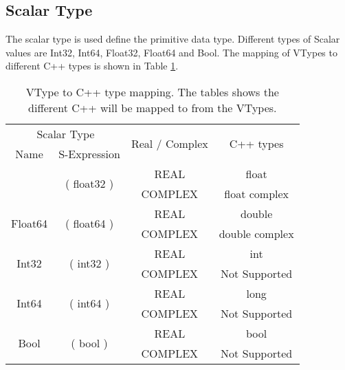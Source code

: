 \subsection{Scalar Type}
The scalar type is used define the primitive data type.
Different types of Scalar values are Int32, Int64, Float32, Float64 and Bool.
The mapping of VTypes to different C++ types is shown in Table \ref{tab:typeMap}.
\begin{table}[h]
\centering
\begin{tabular}{|c|c|c|c|}
\hline
\multicolumn{2}{|c|}{Scalar Type}                                                                 & \multirow{2}{*}{Real / Complex}  & \multirow{2}{*}{C++ types} \\ \cline{1-2}
Name                                         & S-Expression                                      &                              &                            \\ \hhline{|=|=|=|=|}
\multirow{2}{*}{Float32}                     & \multicolumn{1}{c|}{\multirow{2}{*}{( float32 )}} & REAL                         & float                        \\ \cline{3-4} 
                                             & \multicolumn{1}{c|}{}                             & \multicolumn{1}{c|}{COMPLEX} & float complex              \\ \hline
\multirow{2}{*}{Float64}                     & \multicolumn{1}{c|}{\multirow{2}{*}{( float64 )}} & REAL                         & double                       \\ \cline{3-4} 
                                             & \multicolumn{1}{c|}{}                             & \multicolumn{1}{c|}{COMPLEX} & double complex             \\ \hline
\multicolumn{1}{|c|}{\multirow{2}{*}{Int32}} & \multirow{2}{*}{( int32 )}                        & REAL                         & int                      \\ \cline{3-4} 
\multicolumn{1}{|c|}{}                       &                                                   & \multicolumn{1}{c|}{COMPLEX} & Not Supported                          \\ \hline
\multicolumn{1}{|c|}{\multirow{2}{*}{Int64}} & \multirow{2}{*}{( int64 )}                        & REAL                         & long                     \\ \cline{3-4} 
\multicolumn{1}{|c|}{}                       &                                                   & \multicolumn{1}{c|}{COMPLEX} & Not Supported                          \\ \hline
\multicolumn{1}{|c|}{\multirow{2}{*}{Bool}} & \multirow{2}{*}{( bool )}                        & REAL                         & bool                     \\ \cline{3-4} 
\multicolumn{1}{|c|}{}                       &                                                   & \multicolumn{1}{c|}{COMPLEX} & Not Supported                          \\ \hline
\end{tabular}
\caption[VType to C++ type mapping]{VType to C++ type mapping. The tables shows the different C++ will be mapped to from the VTypes.} 
\label{tab:typeMap}
\end{table}
